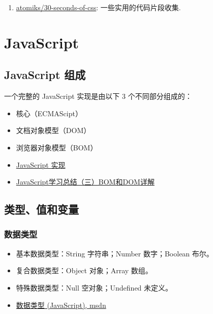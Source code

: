 \begin{enumerate}
\def\labelenumi{\arabic{enumi}.}
\tightlist
\item
  \href{https://github.com/atomiks/30-seconds-of-css}{atomiks/30-seconds-of-css}:
  一些实用的代码片段收集.
\end{enumerate}

\section{JavaScript}\label{javascript}

\subsection{JavaScript 组成}\label{javascript-ux7ec4ux6210}

一个完整的 JavaScript 实现是由以下 3 个不同部分组成的：

\begin{itemize}
\item
  核心（ECMAScipt）
\item
  文档对象模型（DOM）
\item
  浏览器对象模型（BOM）
\item
  \href{http://www.w3school.com.cn/js/pro_js_implement.asp}{JavaScript
  实现}
\item
  \href{http://segmentfault.com/a/1190000000654274}{JavaScript学习总结（三）BOM和DOM详解}
\end{itemize}

\subsection{类型、值和变量}\label{ux7c7bux578bux503cux548cux53d8ux91cf}

\subsubsection{数据类型}\label{ux6570ux636eux7c7bux578b}

\begin{itemize}
\item
  基本数据类型：String 字符串；Number 数字；Boolean 布尔。
\item
  复合数据类型：Object 对象；Array 数组。
\item
  特殊数据类型：Null 空对象；Undefined 未定义。
\item
  \href{https://msdn.microsoft.com/zh-cn/library/7wkd9z69(v=vs.94).aspx}{数据类型
  (JavaScript), msdn}
\end{itemize}

